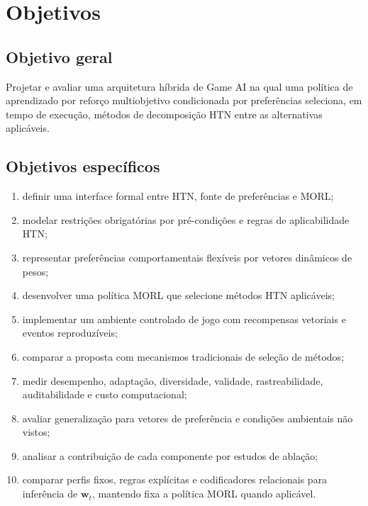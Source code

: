 \chapter{Objetivos}

\section{Objetivo geral}

Projetar e avaliar uma arquitetura híbrida de Game AI na qual uma política de
aprendizado por reforço multiobjetivo condicionada por preferências seleciona,
em tempo de execução, métodos de decomposição HTN entre as alternativas
aplicáveis.

\section{Objetivos específicos}

\begin{enumerate}
\item definir uma interface formal entre HTN, fonte de preferências e MORL;
\item modelar restrições obrigatórias por pré-condições e regras de aplicabilidade HTN;
\item representar preferências comportamentais flexíveis por vetores dinâmicos de pesos;
\item desenvolver uma política MORL que selecione métodos HTN aplicáveis;
\item implementar um ambiente controlado de jogo com recompensas vetoriais e eventos reproduzíveis;
\item comparar a proposta com mecanismos tradicionais de seleção de métodos;
\item medir desempenho, adaptação, diversidade, validade, rastreabilidade, auditabilidade e custo computacional;
\item avaliar generalização para vetores de preferência e condições ambientais não vistos;
\item analisar a contribuição de cada componente por estudos de ablação;
\item comparar perfis fixos, regras explícitas e codificadores relacionais para
inferência de $\mathbf{w}_t$, mantendo fixa a política MORL quando aplicável.
\end{enumerate}

